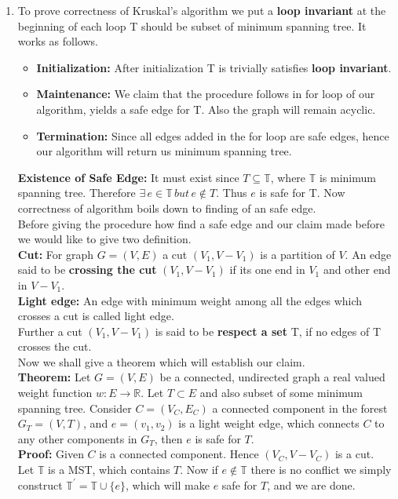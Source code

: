 \documentclass[12pt,a4paper,final]{article}
\theoremstyle{definition}
\begin{document}
\begin{enumerate}
\begin{enumerate}
\item
To prove correctness of Kruskal's algorithm we put a \textbf{loop invariant} at the beginning of each loop T should be subset of minimum spanning tree. It works as follows.
\begin{itemize}
\item
\textbf{Initialization: }After initialization T is trivially satisfies \textbf{loop invariant}.
\item
\textbf{Maintenance: } We claim that the procedure follows in for loop of our algorithm, yields a safe edge for T. Also the graph will remain acyclic.
\item
\textbf{Termination: }Since all edges added in the for loop are safe edges, hence our algorithm will return us minimum spanning tree.
\end{itemize}
\textbf{Existence of Safe Edge: }It must exist since $T \subseteq \mathbb{T}$, where $\mathbb{T}$ is minimum spanning tree. Therefore $\exists \, e \in \mathbb{T}\, but \, e \notin T$. Thus $e$ is safe for T. Now correctness of algorithm boils down to finding of an safe edge.\\
Before giving the procedure how find a safe edge and our claim made before we would like to give two definition.\\
\textbf{Cut: } For graph $G=(V,E)$ a cut $(V_1,V-V_1)$ is a partition of $V$. An edge said to be \textbf{crossing the cut} $(V_1,V-V_1)$ if its one end in $V_1$ and other end in $V-V_1$.\\
\textbf{Light edge:} An edge with minimum weight among all the edges which crosses a cut is called light edge.\\
Further a cut $(V_1,V-V_1)$ is said to be \textbf{respect a set} T, if no edges of T crosses the cut.\\ 
Now we shall give a theorem which will establish our claim.\\


\textbf{Theorem: }Let $G=(V,E)$ be a connected, undirected graph a real valued weight function $w: E \to \mathbb{R}$. Let $T \subset E$ and also subset of some minimum spanning tree. Consider $C=(V_C,E_C)$ a connected component in the forest $G_T=(V,T)$, and $e=(v_1,v_2)$ is a light weight edge, which connects $C$ to any other components in $G_T$, then $e$ is safe for $T$.\\
\textbf{Proof: }Given $C$ is a connected component. Hence $(V_C,V-V_C)$ is a cut.\\
Let $\mathbb{T}$ is a MST, which contains $T$. Now if $e \notin \mathbb{T}$ there is no conflict we simply construct $\mathbb{T^\prime}=\mathbb{T}\cup \{e\}$, which will make $e$ safe for $T$, and we are done.\\


\end{enumerate}
\end{enumerate}
\end{document}
